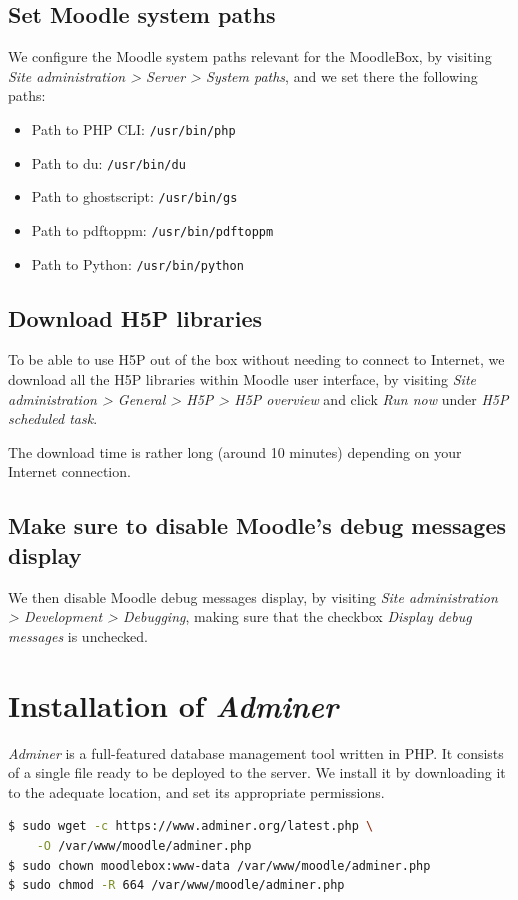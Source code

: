 \documentclass[12pt]{article}
\begin{document}
\subsection{Set Moodle system paths}

We configure the Moodle system paths relevant for the MoodleBox, by visiting \emph{Site administration > Server > System paths}, and we set there the following paths:
\begin{itemize}
\item Path to PHP CLI: \texttt{/usr/bin/php}
\item Path to du: \texttt{/usr/bin/du}
\item Path to ghostscript: \texttt{/usr/bin/gs}
\item Path to pdftoppm: \texttt{/usr/bin/pdftoppm}
\item Path to Python: \texttt{/usr/bin/python}
\end{itemize}

\subsection{Download H5P libraries}

To be able to use H5P out of the box without needing to connect to Internet, we download all the H5P libraries within Moodle user interface, by visiting \emph{Site administration > General > H5P > H5P overview} and click \emph{Run now} under \emph{H5P scheduled task}.

The download time is rather long (around 10 minutes) depending on your Internet connection.

\subsection{Make sure to disable Moodle's debug messages display}

We then disable Moodle debug messages display, by visiting \emph{Site administration > Development > Debugging}, making sure that the checkbox \emph{Display debug messages} is unchecked.

\section{Installation of \textsl{Adminer}}

\textsl{Adminer} is a full-featured database management tool written in PHP.
It consists of a single file ready to be deployed to the server.
We install it by downloading it to the adequate location, and set its appropriate permissions.
\begin{lstlisting}[language=bash]
$ sudo wget -c https://www.adminer.org/latest.php \
    -O /var/www/moodle/adminer.php
$ sudo chown moodlebox:www-data /var/www/moodle/adminer.php
$ sudo chmod -R 664 /var/www/moodle/adminer.php
\end{lstlisting}
\end{document}
